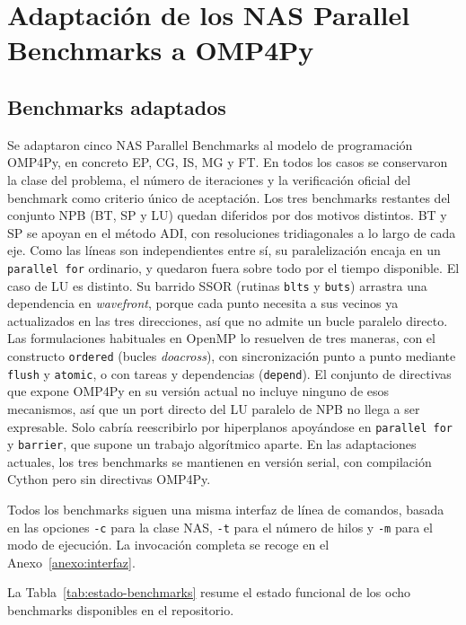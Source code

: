 \chapter{Adaptación de los NAS Parallel Benchmarks a OMP4Py}
\label{chap:adaptacion-nas}

\section{Benchmarks adaptados}
\label{sec:benchmarks-adaptados}

Se adaptaron cinco NAS Parallel Benchmarks al modelo de programación OMP4Py,
en concreto EP, CG, IS, MG y FT. En todos los casos se conservaron la clase del problema,
el número de iteraciones y la verificación oficial del benchmark como criterio
único de aceptación. Los tres benchmarks restantes del conjunto NPB (BT, SP y
LU) quedan diferidos por dos motivos distintos. BT y SP se apoyan en el método
ADI, con resoluciones tridiagonales a lo largo de cada eje. Como las líneas son
independientes entre sí, su paralelización encaja en un \texttt{parallel for}
ordinario, y quedaron fuera sobre todo por el tiempo disponible. El caso de LU
es distinto.
Su barrido SSOR (rutinas \texttt{blts} y \texttt{buts}) arrastra una dependencia
en \emph{wavefront}, porque cada punto necesita a sus vecinos ya actualizados en
las tres direcciones, así que no admite un bucle paralelo directo. Las
formulaciones habituales en OpenMP lo resuelven de tres maneras, con el
constructo \texttt{ordered} (bucles \emph{doacross}), con sincronización punto a
punto mediante \texttt{flush} y \texttt{atomic}, o con tareas y dependencias
(\texttt{depend}). El conjunto de directivas que expone OMP4Py en su versión
actual no incluye ninguno de esos mecanismos, así que un port directo del LU
paralelo de NPB no llega a ser expresable. Solo cabría reescribirlo por
hiperplanos apoyándose en \texttt{parallel for} y \texttt{barrier}, que supone
un trabajo algorítmico aparte. En las adaptaciones actuales, los tres
benchmarks se mantienen en versión serial, con compilación Cython pero sin
directivas OMP4Py.

Todos los benchmarks siguen una misma interfaz de línea de comandos, basada en
las opciones \texttt{-c} para la clase NAS, \texttt{-t} para el número de hilos y
\texttt{-m} para el modo de ejecución. La invocación completa se recoge en el
Anexo~\ref{anexo:interfaz}.

La Tabla~\ref{tab:estado-benchmarks} resume el estado funcional de los ocho
benchmarks disponibles en el repositorio.

